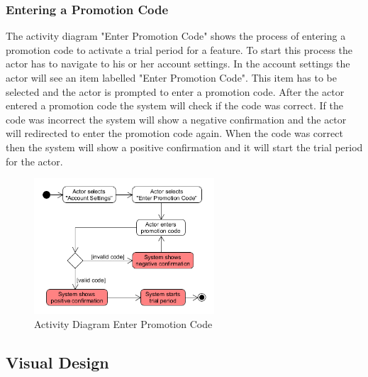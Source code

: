 \subsubsection{Entering a Promotion Code}
\label{sssec:entering_promotion_code}
The activity diagram "Enter Promotion Code" shows the process of entering a promotion code to activate a trial period for a feature. To start this process the actor has to navigate to his or her account settings. In the account settings the actor will see an item labelled "Enter Promotion Code". This item has to be selected and the actor is prompted to enter a promotion code. After the actor entered a promotion code the system will check if the code was correct. If the code was incorrect the system will show a negative confirmation and the actor will redirected to enter the promotion code again. When the code was correct then the system will show a positive confirmation and it will start the trial period for the actor.

\begin{figure}[H]
    \begin{center}
        \includegraphics[width=0.6\textwidth]{images/diagrams/activity_diagrams/ActivityDiagram_EnterPromotionCode.png}
        \caption{Activity Diagram Enter Promotion Code}
        \label{fig:activity_diagram_enter_promotion_code}
    \end{center}
\end{figure}

\subsection{Visual Design}
\label{ssec:visual_design}

